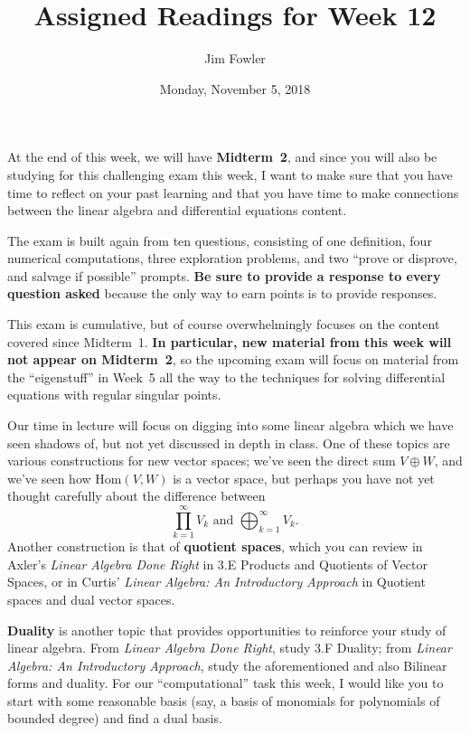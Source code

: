 \documentclass{homework}
\author{Jim Fowler}
\title{Assigned Readings for Week 12}
\date{Monday, November 5, 2018}
\begin{document}
\maketitle

At the end of this week, we will have \textbf{Midterm~2}, and since
you will also be studying for this challenging exam this week, I want
to make sure that you have time to reflect on your past learning and
that you have time to make connections between the linear algebra and
differential equations content.

The exam is built again from ten questions, consisting of one
definition, four numerical computations, three exploration problems,
and two ``prove or disprove, and salvage if possible'' prompts.
\textbf{Be sure to provide a response to every question asked} because
the only way to earn points is to provide responses.

This exam is cumulative, but of course overwhelmingly focuses on the
content covered since Midterm~1.  \textbf{In particular, new material
  from this week will not appear on Midterm~2}, so the upcoming exam
will focus on material from the ``eigenstuff'' in Week~5 all the way
to the techniques for solving differential equations with regular
singular points.

Our time in lecture will focus on digging into some linear algebra
which we have seen shadows of, but not yet discussed in depth in
class.  One of these topics are various constructions for new vector
spaces; we've seen the direct sum $V \oplus W$, and we've seen how
$\mathrm{Hom}(V,W)$ is a vector space, but perhaps you have not
yet thought carefully about the difference between
\[
  \prod_{k=1}^\infty V_k \mbox{ and }   \bigoplus_{k=1}^\infty V_k.
\]
Another construction is that of \textbf{quotient spaces}, which you
can review in Axler's \textit{Linear Algebra Done Right} in
\textsection 3.E Products and Quotients of Vector Spaces, or in
Curtis' \textit{Linear Algebra: An Introductory Approach} in
 Quotient spaces and dual vector spaces.

\textbf{Duality} is another topic that provides opportunities to
reinforce your study of linear algebra.  From \textit{Linear Algebra
  Done Right}, study \textsection 3.F Duality; from \textit{Linear
  Algebra: An Introductory Approach}, study the aforementioned
 and also  Bilinear forms and duality.
For our ``computational'' task this week, I would like you to start
with some reasonable basis (say, a basis of monomials for polynomials
of bounded degree) and find a dual basis.
\end{document}
